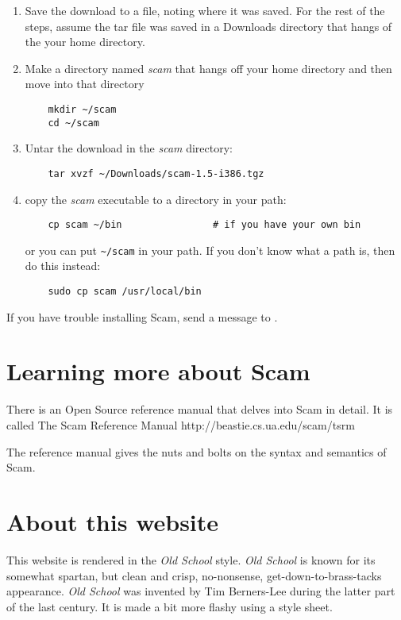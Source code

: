 \documentclass{article}
\begin{document}
\begin{enumerate}

\item
    Save the download to a file, noting where it was saved. For the rest 
    of the steps, assume the tar file was saved in a Downloads directory
    that hangs of the your home directory.
\item
    Make a directory named {\it scam} that hangs off your home directory
    and then move into that directory


\begin{verbatim}
    mkdir ~/scam
    cd ~/scam
\end{verbatim}

\item
    Untar the download in the {\it scam} directory:

\begin{verbatim}
    tar xvzf ~/Downloads/scam-1.5-i386.tgz
\end{verbatim}

\item
    copy the {\it scam} executable to a directory in your path:

\begin{verbatim}
    cp scam ~/bin                # if you have your own bin
\end{verbatim}

or you can put \verb!~/scam! in your path.
If you don't know what a path is, then do this instead:

\begin{verbatim}
    sudo cp scam /usr/local/bin
\end{verbatim}

\end{enumerate}


If you have trouble installing Scam, send a message to 
.

\section*{Learning more about Scam}

There is an Open Source
reference manual that delves into Scam in detail.
It is called 
\xlink
    {The Scam Reference Manual}
    {http://beastie.cs.ua.edu/scam/tsrm}

The reference manual gives the nuts and bolts on the syntax
and semantics of Scam.

\section*{About this website}
This website is rendered in the \emph{Old School} style.
\emph{Old School} is known for its somewhat spartan,
but clean and crisp, no-nonsense, get-down-to-brass-tacks
appearance. \emph{Old School} was invented by
Tim Berners-Lee during the latter part of the last 
century. It is made a bit more flashy using a
style sheet.
\end{document}
